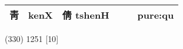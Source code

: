 \documentclass[14pt,a4paper]{scrartcl}
\begin{document}
\begin{longtable}[c]{@{}llllll@{}}
\begin{minipage}[t]{0.14\columnwidth}
靑
\strut\end{minipage} &
\begin{minipage}[t]{0.14\columnwidth}\raggedright\strut
kenX
\strut\end{minipage} &
\begin{minipage}[t]{0.14\columnwidth}\raggedright\strut
倩 tshenH
\strut\end{minipage} &
\begin{minipage}[t]{0.14\columnwidth}\raggedright\strut
\strut\end{minipage} &
\begin{minipage}[t]{0.14\columnwidth}\raggedright\strut
\strut\end{minipage} &
\begin{minipage}[t]{0.14\columnwidth}\raggedright\strut
pure:qu
\strut\end{minipage}\tabularnewline
\bottomrule
\end{longtable}

(330) 1251 {[}10{]}
\end{document}
